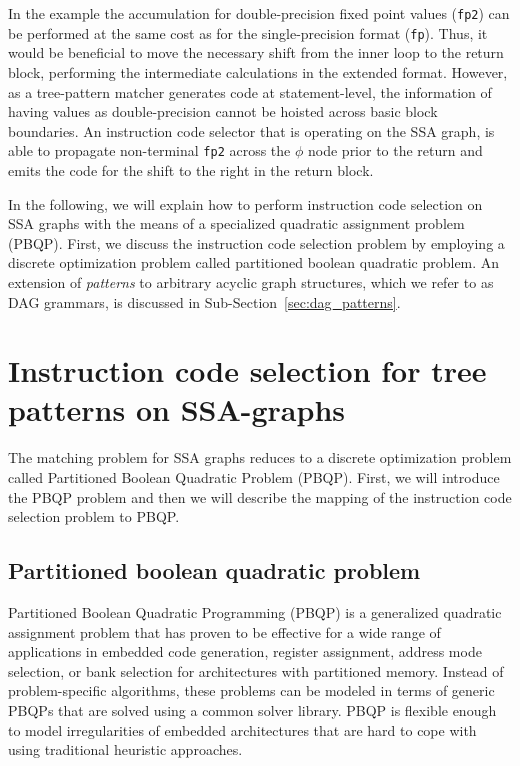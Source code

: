 In the example the accumulation for double-precision fixed
point values (\texttt{fp2}) can be performed at the same cost as for the single-precision format (\texttt{fp}). Thus, it would be
beneficial to move the necessary shift from the inner loop to the
return block, performing the intermediate calculations in the extended
format. However, as a tree-pattern matcher generates code at 
statement-level, the information of having values as double-precision
cannot be hoisted across basic block boundaries.
An instruction code selector that is operating on the SSA graph, is able to propagate 
non-terminal \texttt{fp2} across the $\phi$ node prior to the return 
and emits the code for the shift to the right in the return block.

In the following, we will explain how to perform instruction code selection
on SSA graphs with the means of a specialized quadratic assignment
problem (PBQP). First, we discuss the instruction code selection problem by
employing a discrete optimization problem called partitioned boolean
quadratic problem.  An extension of \emph{patterns} to arbitrary
acyclic graph structures, which we refer to as DAG grammars, is
discussed in Sub-Section~\ref{sec:dag_patterns}.

\section{Instruction code selection for tree patterns on SSA-graphs}
The matching problem for SSA graphs reduces to a discrete optimization
problem called Partitioned Boolean Quadratic Problem (PBQP).  First,
we will introduce the PBQP problem and then we will describe the
mapping of the instruction code selection problem to PBQP.

\subsection{Partitioned boolean quadratic problem}
\label{sec:pbqp}
Partitioned Boolean Quadratic Programming (PBQP) is a generalized
quadratic assignment problem that has proven to be effective for a
wide range of applications in embedded code generation, \eg
register assignment, address mode selection, or
bank selection for architectures with partitioned memory. Instead of
problem-specific algorithms, these problems can be modeled in terms of
generic {PBQP}s that are solved using a common solver library. PBQP is
flexible enough to model irregularities of embedded architectures that
are hard to cope with using traditional heuristic approaches.

